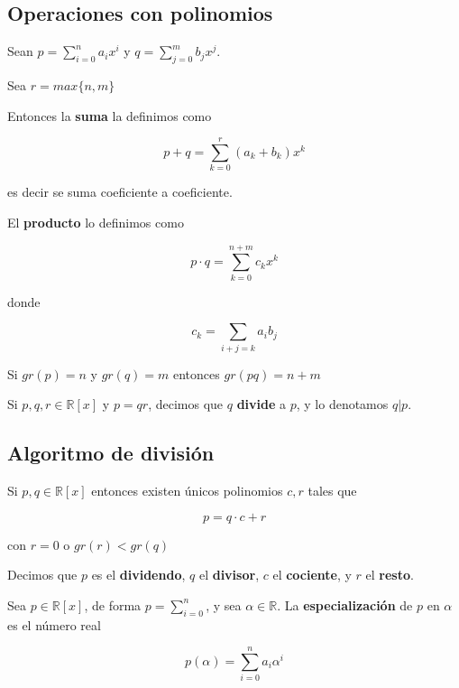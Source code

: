 \subsection{Operaciones con polinomios}

\begin{definition} 
	
Sean $p = \sum_{i=0}^n a_i x^i$ y $q = \sum_{j=0}^m b_j x^j$.

Sea $r = max\{ n,m \}$

Entonces la \textbf{suma} la definimos como

$$ p+q = \sum_{k=0}^r (a_k+b_k) x^k $$

es decir se suma coeficiente a coeficiente.

El \textbf{producto} lo definimos como

$$ p \cdot q = \sum_{k=0}^{n+m} c_k x^k $$

donde 

$$ c_k = \sum_{i+j=k} a_i b_j $$

\end{definition}

\begin{observation}
Si $gr(p) = n$ y $gr(q) = m$ entonces $gr(pq) = n+m$
\end{observation}


\begin{definition}[Divisibilidad] 
Si $p,q,r \in \mathbb{R}[x]$ y $p = qr$, decimos que $q$ \textbf{divide} a $p$, y lo denotamos $q|p$.
\end{definition}

\subsection{Algoritmo de división}

\begin{theorem} 
Si $p,q \in \mathbb{R}[x]$ entonces existen únicos polinomios $c,r$ tales que

$$ p = q \cdot c + r$$

con $r=0$ o $gr(r) < gr(q)$

Decimos que $p$ es el \textbf{dividendo}, $q$ el \textbf{divisor}, $c$ el \textbf{cociente}, y $r$ el \textbf{resto}.
\end{theorem}

\begin{definition}[Especialización] 
Sea $p \in \mathbb{R}[x]$, de forma $p = \sum_{i=0}^n$, y sea $\alpha \in \mathbb{R}$.  La \textbf{especialización} de $p$ en $\alpha$ es el número real

$$ p(\alpha) = \sum_{i=0}^n a_i \alpha^i $$
\end{definition}

